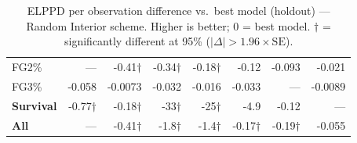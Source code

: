 \begin{table}[H]
{\begin{tabular}{lrrrrrrr}
FG2\% & --- & -0.41$\dagger$ & -0.34$\dagger$ & -0.18$\dagger$ & -0.12 & -0.093 & -0.021 \\[2pt]
FG3\% & -0.058 & -0.0073 & -0.032 & -0.016 & -0.033 & --- & -0.0089 \\[2pt]
\midrule
\textbf{Survival} & -0.77$\dagger$ & -0.18$\dagger$ & -33$\dagger$ & -25$\dagger$ & -4.9 & -0.12 & --- \\
\midrule
\textbf{All} & --- & -0.41$\dagger$ & -1.8$\dagger$ & -1.4$\dagger$ & -0.17$\dagger$ & -0.19$\dagger$ & -0.055 \\
\bottomrule
\end{tabular}
}
\caption{ELPPD per observation difference vs.\ best model (holdout) --- Random Interior scheme. Higher is better; 0 = best model. $\dagger$ = significantly different at 95\% ($|\Delta|>1.96\times\mathrm{SE}$).}
\label{tab:elppd_random_interior}
\end{table}


